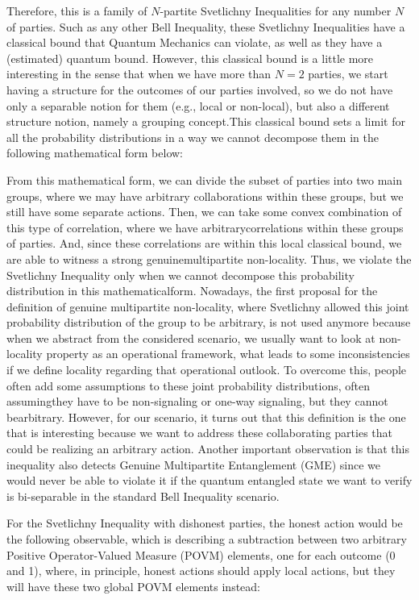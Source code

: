 \documentclass[12pt]{article}
\begin{document}
    Therefore, this is a family of $N$-partite Svetlichny Inequalities for any number $N$ of parties. Such as any other Bell Inequality, these Svetlichny Inequalities have a classical bound that Quantum Mechanics can violate, as well as they have a (estimated) quantum bound. However, this classical bound is a little more interesting in the sense that when we have more than $N = 2$ parties, we start having a structure for the outcomes of our parties involved, so we do not have only a separable notion for them (e.g., local or non-local), but also a different structure notion, namely a grouping concept.\break This classical bound sets a limit for all the probability distributions in a way we cannot decompose them in the following mathematical form below:
    
    From this mathematical form, we can divide the subset of parties into two main groups, where we may have arbitrary collaborations within these groups, but we still have some separate actions. Then, we can take some convex combination of this type of correlation, where we have arbitrary\break correlations within these groups of parties. And, since these correlations are within this local classical bound, we are able to witness a strong genuine\break multipartite non-locality. Thus, we violate the Svetlichny Inequality only when we cannot decompose this probability distribution in this mathematical\break form. Nowadays, the first proposal for the definition of genuine multipartite non-locality, where Svetlichny allowed this joint probability distribution of the group to be arbitrary, is not used anymore because when we abstract from the considered scenario, we usually want to look at non-locality property as an operational framework, what leads to some inconsistencies if we define locality regarding that operational outlook. To overcome this, people often add some assumptions to these joint probability distributions, often assuming\break they have to be non-signaling or one-way signaling, but they cannot be\break arbitrary. However, for our scenario, it turns out that this definition is the one that is interesting because we want to address these collaborating parties that could be realizing an arbitrary action. Another important observation is that this inequality also detects Genuine Multipartite Entanglement (GME) since we would never be able to violate it if the quantum entangled state we want to verify is bi-separable in the standard Bell Inequality scenario.

    \noindent For the Svetlichny Inequality with dishonest parties, the honest action would be the following observable, which is describing a subtraction between two arbitrary Positive Operator-Valued Measure (POVM) elements, one for each outcome (0 and 1), where, in principle, honest actions should apply local actions, but they will have these two global POVM elements instead:
\end{document}
